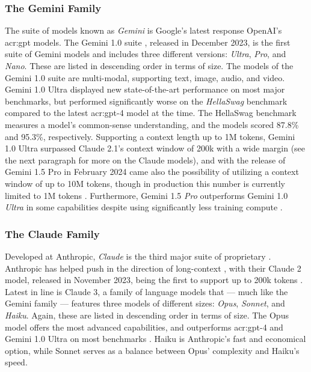 \subsubsection{The Gemini Family}
\label{subsubsec:gemini}

The suite of models known as \textit{Gemini} is Google's latest response OpenAI's \acrshort{acr:gpt} models. The Gemini 1.0 suite \citep{geminiteamGeminiFamilyHighly2024}, released in December 2023, is the first suite of Gemini models and includes three different versions: \textit{Ultra}, \textit{Pro}, and \textit{Nano}. These are listed in descending order in terms of size. The models of the Gemini 1.0 suite are multi-modal, supporting text, image, audio, and video. Gemini 1.0 Ultra displayed new state-of-the-art performance on most major benchmarks, but performed significantly worse on the \textit{HellaSwag} benchmark \citep{zellersHellaSwagCanMachine2019} compared to the latest \acrshort{acr:gpt}-4 model at the time. The HellaSwag benchmark measures a model's common-sense understanding, and the models scored 87.8\% and 95.3\%, respectively. Supporting a context length up to 1M tokens, Gemini 1.0 Ultra surpassed Claude 2.1's context window of 200k with a wide margin (see the next paragraph for more on the Claude models), and with the release of Gemini 1.5 Pro in February 2024 came also the possibility of utilizing a context window of up to 10M tokens, though in production this number is currently limited to 1M tokens \citep{geminiteamGeminiUnlockingMultimodal2024, pichaiOurNextgenerationModel2024}. Furthermore, Gemini 1.5 \textit{Pro} outperforms Gemini 1.0 \textit{Ultra} in some capabilities despite using significantly less training compute \citep[31]{geminiteamGeminiUnlockingMultimodal2024}.

\subsubsection{The Claude Family}
\label{subsubsec:claude}

Developed at Anthropic, \textit{Claude} is the third major suite of proprietary . Anthropic has helped push in the direction of long-context , with their Claude 2 model, released in November 2023, being the first to support up to 200k tokens \citep[9]{anthropicModelCardEvaluations2023}. Latest in line is Claude 3, a family of language models that --- much like the Gemini family --- features three models of different sizes: \textit{Opus}, \textit{Sonnet}, and \textit{Haiku}. Again, these are listed in descending order in terms of size. The Opus model offers the most advanced capabilities, and outperforms \acrshort{acr:gpt}-4 and Gemini 1.0 Ultra on most benchmarks \citep[6]{anthropicClaudeModelFamily2024}. Haiku is Anthropic's fast and economical option, while Sonnet serves as a balance between Opus' complexity and Haiku's speed.

